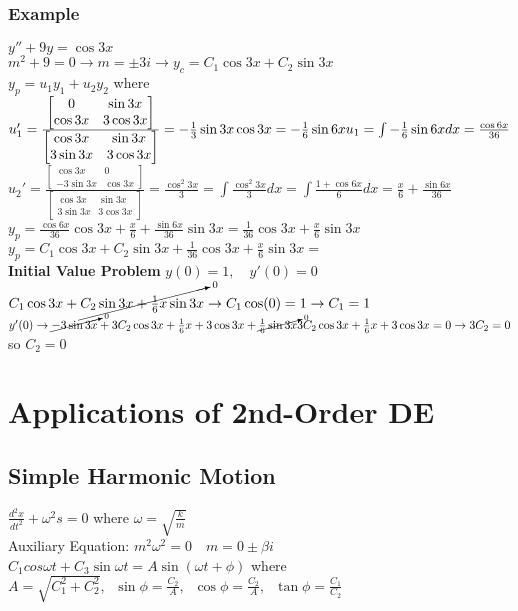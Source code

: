 \documentclass{article}
\begin{document}
\subsubsection{Example}$y''+9y=\cos 3x$
\\[0.1in]$m^2+9=0 \rightarrow m=\pm 3i \rightarrow y_c=C_1 \cos 3x + C_2 \sin 3x $
\\[0.1in]$y_p=u_1y_1+u_2y_2$ where $u_1'=\frac{\begin{bmatrix}0&\sin 3x\\\cos 3x&3\cos 3x\end{bmatrix}}{\begin{bmatrix}\cos 3x&\sin 3x\\3\sin 3x & 3\cos 3x \end{bmatrix}}= -\frac{1}{3}\sin 3x \cos 3x = -\frac{1}{6}\sin 6x\\
u_1=\int -\frac{1}{6}\sin 6x dx = \frac{\cos 6x}{36}$\\
$u_2'=\frac{\begin{bmatrix}\cos 3x & 0 \\ -3\sin 3x & \cos 3x\end{bmatrix}}{\begin{bmatrix}\cos 3x&\sin 3x\\3\sin 3x & 3\cos 3x \end{bmatrix}} = \frac{\cos^2 3x}{3}=\int \frac{\cos^2 3x}{3} dx=\int \frac{1+ \cos 6x}{6} dx = \frac{x}{6}+\frac{\sin 6x}{36}$
\\$y_p=\frac{\cos 6x }{36}\cos 3x + \frac{x}{6}+\frac{\sin 6x}{36}\sin 3x = \frac{1}{36}\cos 3x + \frac{x}{6}\sin 3x$
\\$y_p=C_1 \cos 3x + C_2 \sin 3x+\frac{1}{36}\cos 3x + \frac{x}{6}\sin 3x =$ \\
\textbf{Initial Value Problem} $y(0)=1,\quad y'(0)=0$
\\$C_1\cos 3x + \cancelto{0}{C_2 \sin 3x + \frac{1}{6}x \sin 3x} \rightarrow C_1 \cos(0)=1 \rightarrow C_1=1$
\\$y'(0) \rightarrow \cancelto{0}{-3\sin 3x} +3C_2\cos 3x+\frac{1}{6}x+3\cos 3x + \cancelto{0}{\frac{1}{6}\sin 3x}\\
3C_2\cos 3x+\frac{1}{6}x+3\cos 3x=0 \rightarrow 3C_2=0$ so $C_2=0$
\\
\pagebreak
\section{Applications of 2nd-Order DE}
\subsection{Simple Harmonic Motion}
$\frac{d^2x}{dt^2}+\omega ^2s=0$ where $\omega = \sqrt{\frac{k}{m}}$
\\Auxiliary Equation: $m^2\omega ^2=0 \quad m=0\pm\beta i$
\\$C_1cos \omega t + C_3 \sin \omega t = A\sin (\omega t + \phi)$ where $A=\sqrt{C_1^2+C_2^2},\;\; \sin\phi=\frac{C_2}{A},\;\; \cos\phi=\frac{C_2}{A},\;\;\tan\phi=\frac{C_1}{C_2}$
\end{document}

